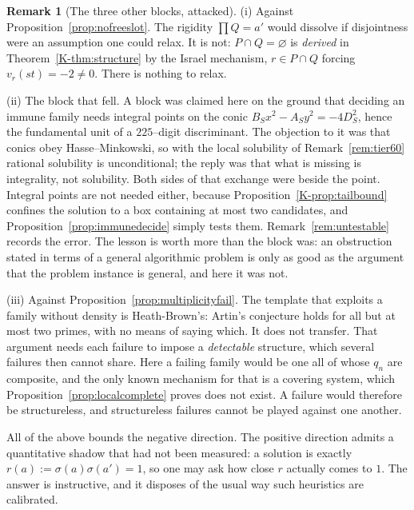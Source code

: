 \documentclass[11pt]{article}
\theoremstyle{definition}
\newtheorem{remark}[theorem]{Remark}
\begin{document}
\begin{remark}[The three other blocks, attacked]\label{rem:blockattacks}
\textup{(i) Against Proposition~\ref{prop:nofreeslot}.} The rigidity $\prod Q=a'$ would dissolve if
disjointness were an assumption one could relax. It is not: $P\cap Q=\varnothing$ is
\emph{derived} in Theorem~\ref{K-thm:structure} by the Israel mechanism, $r\in P\cap Q$ forcing
$v_r(st)=-2\neq0$. There is nothing to relax.

\textup{(ii) The block that fell.} A block was claimed here on the ground that deciding an immune
family needs integral points on the conic $B_Sx^2-A_Sy^2=-4D_S^2$, hence the fundamental unit of a
$225$--digit discriminant. The objection to it was that conics obey Hasse--Minkowski, so with the
local solubility of Remark~\ref{rem:tier60} rational solubility is unconditional; the reply was that
what is missing is integrality, not solubility. Both sides of that exchange were beside the point.
Integral points are not needed either, because Proposition~\ref{K-prop:tailbound} confines the solution
to a box containing at most two candidates, and Proposition~\ref{prop:immunedecide} simply tests
them. Remark~\ref{rem:untestable} records the error. The lesson is worth more than the block was: an
obstruction stated in terms of a general algorithmic problem is only as good as the argument that the
problem instance is general, and here it was not.

\textup{(iii) Against Proposition~\ref{prop:multiplicityfail}.} The template that exploits a family
without density is Heath-Brown's: Artin's conjecture holds for all but at most two primes, with no
means of saying which. It does not transfer. That argument needs each failure to impose a
\emph{detectable} structure, which several failures then cannot share. Here a failing family would
be one all of whose $q_n$ are composite, and the only known mechanism for that is a covering system,
which Proposition~\ref{prop:localcomplete} proves does not exist. A failure would therefore be
structureless, and structureless failures cannot be played against one another.
\end{remark}

All of the above bounds the negative direction. The positive direction admits a quantitative
shadow that had not been measured: a solution is exactly $r(a):=\sigma(a)\sigma(a')=1$, so one may
ask how close $r$ actually comes to $1$. The answer is instructive, and it disposes of the usual
way such heuristics are calibrated.
\end{document}
